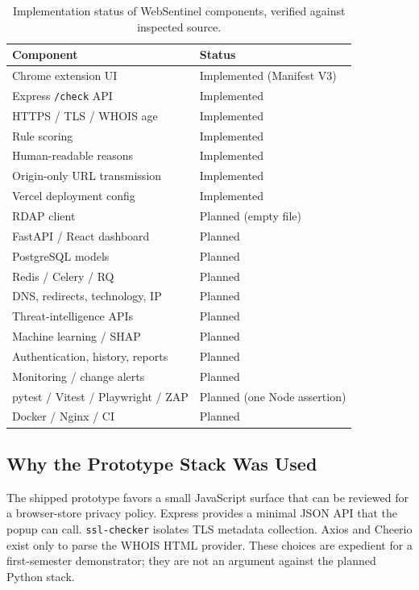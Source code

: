 \documentclass[conference]{IEEEtran}
\begin{document}
\begin{table}[!t]
\centering
\caption{Implementation status of WebSentinel components, verified against inspected source.}
\label{tab:status}
\renewcommand{\arraystretch}{1.08}
\begin{tabular}{>{\raggedright\arraybackslash}p{3.4cm}>{\raggedright\arraybackslash}p{4.4cm}}
\toprule
Component & Status \\
\midrule
Chrome extension UI & Implemented (Manifest V3) \\
Express \texttt{/check} API & Implemented \\
HTTPS / TLS / WHOIS age & Implemented \\
Rule scoring & Implemented \\
Human-readable reasons & Implemented \\
Origin-only URL transmission & Implemented \\
Vercel deployment config & Implemented \\
RDAP client & Planned (empty file) \\
FastAPI / React dashboard & Planned \\
PostgreSQL models & Planned \\
Redis / Celery / RQ & Planned \\
DNS, redirects, technology, IP & Planned \\
Threat-intelligence APIs & Planned \\
Machine learning / SHAP & Planned \\
Authentication, history, reports & Planned \\
Monitoring / change alerts & Planned \\
pytest / Vitest / Playwright / ZAP & Planned (one Node assertion) \\
Docker / Nginx / CI & Planned \\
\bottomrule
\end{tabular}
\end{table}

\subsection{Why the Prototype Stack Was Used}
The shipped prototype favors a small JavaScript surface that can be reviewed for a browser-store privacy policy. Express provides a minimal JSON API that the popup can call. \texttt{ssl-checker} isolates TLS metadata collection. Axios and Cheerio exist only to parse the WHOIS HTML provider. These choices are expedient for a first-semester demonstrator; they are not an argument against the planned Python stack.
\end{document}
